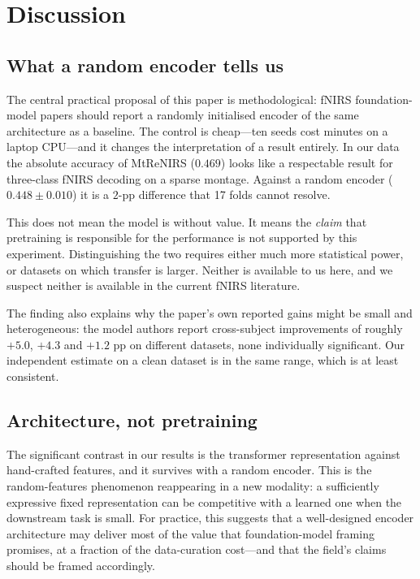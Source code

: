 \section{Discussion}
\label{sec:discussion}

\subsection{What a random encoder tells us}
The central practical proposal of this paper is methodological: fNIRS foundation-model papers
should report a randomly initialised encoder of the same architecture as a baseline. The control
is cheap---ten seeds cost minutes on a laptop CPU---and it changes the interpretation of a
result entirely. In our data the absolute accuracy of MtReNIRS ($0.469$) looks like a
respectable result for three-class fNIRS decoding on a sparse montage. Against a random encoder
($0.448 \pm 0.010$) it is a $2$-pp difference that 17 folds cannot resolve.

This does not mean the model is without value. It means the \emph{claim} that pretraining is
responsible for the performance is not supported by this experiment. Distinguishing the two
requires either much more statistical power, or datasets on which transfer is larger. Neither
is available to us here, and we suspect neither is available in the current fNIRS literature.

The finding also explains why the paper's own reported gains might be small and heterogeneous:
the model authors report cross-subject improvements of roughly $+5.0$, $+4.3$ and $+1.2$ pp on
different datasets, none individually significant. Our independent estimate on a clean dataset
is in the same range, which is at least consistent.

\subsection{Architecture, not pretraining}
The significant contrast in our results is the transformer representation against hand-crafted
features, and it survives with a random encoder. This is the random-features phenomenon
\citep{rahimi2007random} reappearing in a new modality: a sufficiently expressive fixed
representation can be competitive with a learned one when the downstream task is small. For
practice, this suggests that a well-designed encoder architecture may deliver most of the value
that foundation-model framing promises, at a fraction of the data-curation cost---and that the
field's claims should be framed accordingly.

